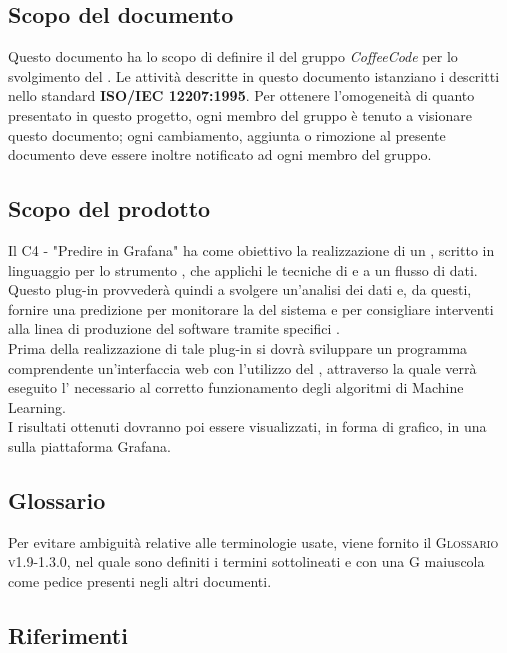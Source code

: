 \documentclass[../norme-di-progetto.tex]{subfiles}
\begin{document}
\subsection{Scopo del documento}
Questo documento ha lo scopo di definire il  del gruppo \emph{CoffeeCode} per lo svolgimento del .
Le attività descritte in questo documento istanziano i  descritti nello standard \textbf{ISO/IEC 12207:1995}. Per ottenere l'omogeneità di quanto presentato in questo progetto, ogni membro del gruppo è tenuto a visionare questo documento; ogni cambiamento, aggiunta o rimozione al presente documento deve essere inoltre notificato ad ogni membro del gruppo.

\subsection{Scopo del prodotto}
Il  C4 - "Predire in Grafana" ha come obiettivo la realizzazione di un , scritto in linguaggio  per lo strumento  , che applichi le tecniche di   e  a un flusso di dati. Questo plug-in provvederà quindi a svolgere un'analisi dei dati e, da questi, fornire una predizione per monitorare la  del sistema e per consigliare interventi alla linea di produzione del software tramite specifici . \\
Prima della realizzazione di tale plug-in si dovrà sviluppare un programma comprendente un'interfaccia web con l'utilizzo del  , attraverso la quale verrà eseguito l' necessario al corretto funzionamento degli algoritmi di Machine Learning. \\
I risultati ottenuti dovranno poi essere visualizzati, in forma di grafico, in una  sulla piattaforma Grafana.

\subsection{Glossario}
Per evitare ambiguità relative alle terminologie usate, viene fornito il \textsc{Glossario v1.9-1.3.0}, nel quale sono definiti i termini sottolineati e con una G maiuscola come pedice presenti negli altri documenti.

\subsection{Riferimenti}
\end{document}
